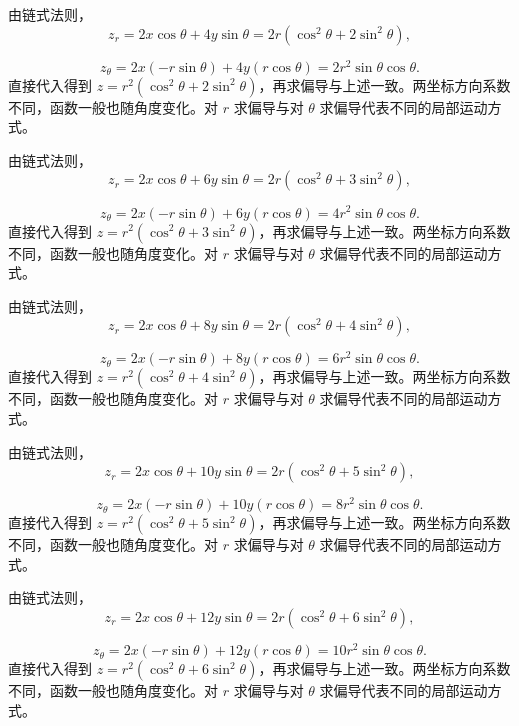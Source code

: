 \documentclass[UTF8,12pt,a4paper,fontset=fandol]{ctexart}
\begin{document}
\begin{solve}\label{ans:c33q8}
由链式法则，
\[
z_r=2x\cos\theta+4y\sin\theta=2r(\cos^2\theta+2\sin^2\theta),
\]

\[
z_\theta=2x(-r\sin\theta)+4y(r\cos\theta)=2r^2\sin\theta\cos\theta.
\]
直接代入得到 $z=r^2(\cos^2\theta+2\sin^2\theta)$，再求偏导与上述一致。两坐标方向系数不同，函数一般也随角度变化。对 $r$ 求偏导与对 $\theta$ 求偏导代表不同的局部运动方式。
\end{solve}

\begin{solve}\label{ans:c33q9}
由链式法则，
\[
z_r=2x\cos\theta+6y\sin\theta=2r(\cos^2\theta+3\sin^2\theta),
\]

\[
z_\theta=2x(-r\sin\theta)+6y(r\cos\theta)=4r^2\sin\theta\cos\theta.
\]
直接代入得到 $z=r^2(\cos^2\theta+3\sin^2\theta)$，再求偏导与上述一致。两坐标方向系数不同，函数一般也随角度变化。对 $r$ 求偏导与对 $\theta$ 求偏导代表不同的局部运动方式。
\end{solve}

\begin{solve}\label{ans:c33q10}
由链式法则，
\[
z_r=2x\cos\theta+8y\sin\theta=2r(\cos^2\theta+4\sin^2\theta),
\]

\[
z_\theta=2x(-r\sin\theta)+8y(r\cos\theta)=6r^2\sin\theta\cos\theta.
\]
直接代入得到 $z=r^2(\cos^2\theta+4\sin^2\theta)$，再求偏导与上述一致。两坐标方向系数不同，函数一般也随角度变化。对 $r$ 求偏导与对 $\theta$ 求偏导代表不同的局部运动方式。
\end{solve}

\begin{solve}\label{ans:c33q11}
由链式法则，
\[
z_r=2x\cos\theta+10y\sin\theta=2r(\cos^2\theta+5\sin^2\theta),
\]

\[
z_\theta=2x(-r\sin\theta)+10y(r\cos\theta)=8r^2\sin\theta\cos\theta.
\]
直接代入得到 $z=r^2(\cos^2\theta+5\sin^2\theta)$，再求偏导与上述一致。两坐标方向系数不同，函数一般也随角度变化。对 $r$ 求偏导与对 $\theta$ 求偏导代表不同的局部运动方式。
\end{solve}

\begin{solve}\label{ans:c33q12}
由链式法则，
\[
z_r=2x\cos\theta+12y\sin\theta=2r(\cos^2\theta+6\sin^2\theta),
\]

\[
z_\theta=2x(-r\sin\theta)+12y(r\cos\theta)=10r^2\sin\theta\cos\theta.
\]
直接代入得到 $z=r^2(\cos^2\theta+6\sin^2\theta)$，再求偏导与上述一致。两坐标方向系数不同，函数一般也随角度变化。对 $r$ 求偏导与对 $\theta$ 求偏导代表不同的局部运动方式。
\end{solve}
\end{document}
